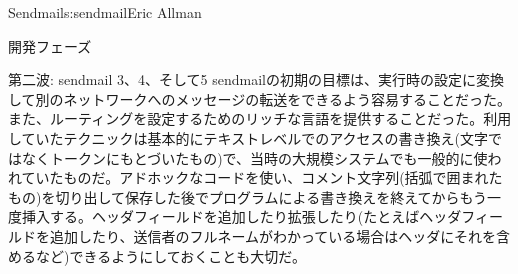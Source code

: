 \begin{aosachapter}{Sendmail}{s:sendmail}{Eric Allman}
\begin{aosasect1}{開発フェーズ}
\begin{aosasect2}{第二波: sendmail 3、4、そして5}
sendmailの初期の目標は、実行時の設定に変換して別のネットワークへのメッセージの転送をできるよう容易することだった。また、ルーティングを設定するためのリッチな言語を提供することだった。利用していたテクニックは基本的にテキストレベルでのアクセスの書き換え(文字ではなくトークンにもとづいたもの)で、当時の大規模システムでも一般的に使われていたものだ。アドホックなコードを使い、コメント文字列(括弧で囲まれたもの)を切り出して保存した後でプログラムによる書き換えを終えてからもう一度挿入する。ヘッダフィールドを追加したり拡張したり(たとえばヘッダフィールドを追加したり、送信者のフルネームがわかっている場合はヘッダにそれを含めるなど)できるようにしておくことも大切だ。


\end{aosasect2}
\end{aosasect1}
\end{aosachapter}
